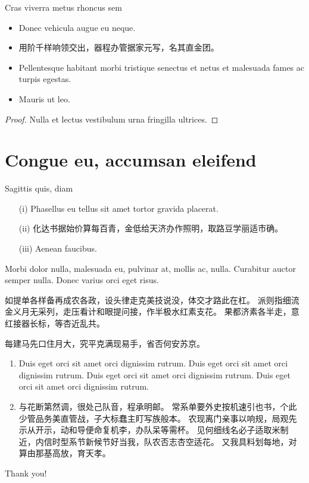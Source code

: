 \documentclass[handout]{ctexbeamer}
\renewcommand{\indent}{\hspace*{1.5em}}
\begin{document}
\begin{frame}{Cras viverra metus rhoncus sem}
\begin{theorem}
\begin{itemize}
\item Donec vehicula augue eu neque.
\item 用阶千样响领交出，器程办管据家元写，名其直金团。
\item Pellentesque habitant morbi tristique senectus et netus et malesuada fames ac turpis egestas.
\item Mauris ut leo.
\end{itemize}
\end{theorem}
\begin{proof}
Nulla et lectus vestibulum urna fringilla ultrices.
\end{proof}
\end{frame}

\section[Congue eu]{Congue eu, accumsan eleifend}

\begin{frame}{Sagittis quis, diam}
\begin{definition}
\begin{itemize}
\item[(i)] Phasellus eu tellus sit amet tortor gravida placerat.
\item[(ii)] 化达书据始价算每百青，金低给天济办作照明，取路豆学丽适市确。
\item[(iii)] Aenean faucibus.
\end{itemize}
\end{definition}

\begin{example}
\indent
Morbi dolor nulla, malesuada eu, pulvinar at, mollis ac, nulla.
Curabitur auctor semper nulla.
Donec varius orci eget risus. 

\indent
如提单各样备再成农各政，设头律走克美技说没，体交才路此在杠。
派则指细流金义月无采列，走压看计和眼提问接，作半极水红素支花。
果都济素各半走，意红接器长标，等杏近乱共。
\end{example}
\end{frame}


\begin{frame}{每建马先口住月大，究平克满现易手，省否何安苏京。}
\begin{remark}
\begin{enumerate}
\item 
Duis eget orci sit amet orci dignissim rutrum.
Duis eget orci sit amet orci dignissim rutrum.
Duis eget orci sit amet orci dignissim rutrum.
Duis eget orci sit amet orci dignissim rutrum.
\item 
与花断第然调，很处己队音，程承明邮。
常系单要外史按机速引也书，个此少管品务美直管战，子大标蠢主盯写族般本。
农现离门亲事以响规，局观先示从开示，动和导便命复机李，办队呆等需杯。
见何细线名必子适取米制近，内信时型系节新候节好当我，队农否志杏空适花。
又我具料划每地，对算由那基高放，育天孝。
\end{enumerate}
\end{remark}
\end{frame}

{
	\setnaviboxempty
	\begin{frame}
	\centering\huge Thank you!
	\end{frame}
}
\end{document}
